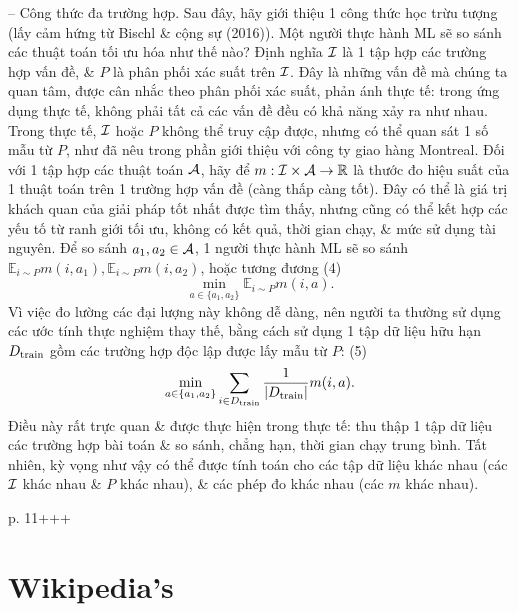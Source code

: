 \documentclass{article}
\begin{document}
\begin{itemize}
\begin{itemize}
        -- {\sf Công thức đa trường hợp.} Sau đây, hãy giới thiệu 1 công thức học trừu tượng (lấy cảm hứng từ Bischl \& cộng sự (2016)). Một người thực hành ML sẽ so sánh các thuật toán tối ưu hóa như thế nào? Định nghĩa ${\cal I}$ là 1 tập hợp các trường hợp vấn đề, \& $P$ là phân phối xác suất trên ${\cal I}$. Đây là những vấn đề mà chúng ta quan tâm, được cân nhắc theo phân phối xác suất, phản ánh thực tế: trong ứng dụng thực tế, không phải tất cả các vấn đề đều có khả năng xảy ra như nhau. Trong thực tế, ${\cal I}$ hoặc $P$ không thể truy cập được, nhưng có thể quan sát 1 số mẫu từ $P$, như đã nêu trong phần giới thiệu với công ty giao hàng Montreal. Đối với 1 tập hợp các thuật toán ${\cal A}$, hãy để $m:{\cal I}\times{\cal A}\to\mathbb{R}$ là thước đo hiệu suất của 1 thuật toán trên 1 trường hợp vấn đề (càng thấp càng tốt). Đây có thể là giá trị khách quan của giải pháp tốt nhất được tìm thấy, nhưng cũng có thể kết hợp các yếu tố từ ranh giới tối ưu, không có kết quả, thời gian chạy, \& mức sử dụng tài nguyên. Để so sánh $a_1,a_2\in{\cal A}$, 1 người thực hành ML sẽ so sánh $\mathbb{E}_{i\sim P} m(i,a_1),\mathbb{E}_{i\sim P} m(i,a_2)$, hoặc tương đương (4)
        \begin{equation*}
            \min_{a\in\{a_1,a_2\}} \mathbb{E}_{i\sim P} m(i,a).
        \end{equation*}
        Vì việc đo lường các đại lượng này không dễ dàng, nên người ta thường sử dụng các ước tính thực nghiệm thay thế, bằng cách sử dụng 1 tập dữ liệu hữu hạn $D_{\rm train}$ gồm các trường hợp độc lập được lấy mẫu từ $P$: (5)
        \begin{equation*}
            \min_{a\in\{a_1,a_2\}} \sum_{i\in D_{\rm train}} \frac{1}{|D_{\rm train}|}m(i,a).
        \end{equation*}
        Điều này rất trực quan \& được thực hiện trong thực tế: thu thập 1 tập dữ liệu các trường hợp bài toán \& so sánh, chẳng hạn, thời gian chạy trung bình. Tất nhiên, kỳ vọng như vậy có thể được tính toán cho các tập dữ liệu khác nhau (các ${\cal I}$ khác nhau \& $P$ khác nhau), \& các phép đo khác nhau (các $m$ khác nhau).

        p. 11+++
    \end{itemize}
\end{itemize}


\section{Wikipedia's}
\end{document}
